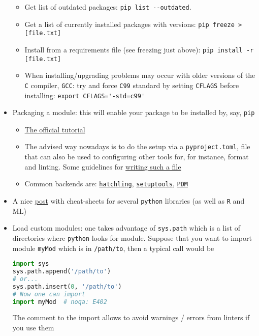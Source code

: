 \documentclass[a4paper,12pt,%
              final%
              ]{article}
\begin{document}
\begin{itemize}
\begin{itemize}
      \item Get list of outdated packages: \verb|pip list --outdated|.
      \item Get a list of currently installed packages with versions: \verb|pip freeze > [file.txt]|
      \item Install from a requirements file (see freezing just above): \verb|pip install -r [file.txt]|
      \item When installing/upgrading problems may occur with older versions of the \texttt{C} compiler, \texttt{GCC}: try and force \texttt{C99} standard by setting \texttt{CFLAGS} before installing: \verb|export CFLAGS='-std=c99'|
    \end{itemize}
  \item Packaging a module: this will enable your package to be installed by, say, \texttt{pip}
    \begin{itemize}
      \item \href{https://packaging.python.org/en/latest/tutorials/packaging-projects/}{The official tutorial}
      \item The advised way nowadays is to do the setup via a \texttt{pyproject.toml}, file that can also be used to configuring other tools for, for instance, format and linting. Some guidelines for \href{https://packaging.python.org/en/latest/guides/writing-pyproject-toml}{writing such a file}
      \item Common backends are: \href{https://hatch.pypa.io/dev/why/#build-backend}{\texttt{hatchling}}, \href{https://setuptools.pypa.io/en/latest/index.html}{\texttt{setuptools}}, \href{https://pdm-project.org/en/latest/}{\texttt{PDM}}
    \end{itemize}
  \item A nice \href{https://medium.com/@anushkhabajpai/top-data-science-cheat-sheets-ml-dl-python-r-sql-maths-statistics-5239d4568225}{post} with cheat-sheets for several \texttt{python} libraries (as well as \texttt{R} and ML)
  \item Load custom modules: one takes advantage of \verb|sys.path| which is a list of directories where \texttt{python} looks for module. Suppose that you want to import module \texttt{myMod} which is in \texttt{/path/to}, then a typical call would be
\begin{lstlisting}[language=python]
import sys
sys.path.append('/path/to')
# or...
sys.path.insert(0, '/path/to')
# Now one can import
import myMod  # noqa: E402
\end{lstlisting}
    The comment to the import allows to avoid warnings / errors from linters if you use them

\end{itemize}
\end{document}

